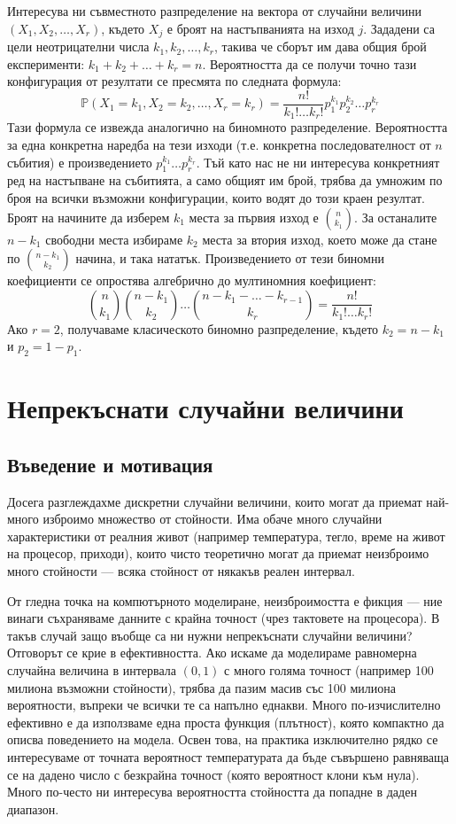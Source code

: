 Интересува ни съвместното разпределение на вектора от случайни величини $(X_1, X_2, \dots, X_r)$, където $X_j$ е броят на настъпванията на изход $j$. Зададени са цели неотрицателни числа $k_1, k_2, \dots, k_r$, такива че сборът им дава общия брой експерименти: $k_1 + k_2 + \dots + k_r = n$.
Вероятността да се получи точно тази конфигурация от резултати се пресмята по следната формула:
\[
\mathbb{P}(X_1=k_1, X_2=k_2, \dots, X_r=k_r) = \frac{n!}{k_1! \dots k_r!} p_1^{k_1} p_2^{k_2} \dots p_r^{k_r}
\]
Тази формула се извежда аналогично на биномното разпределение. Вероятността за една конкретна наредба на тези изходи (т.е. конкретна последователност от $n$ събития) е произведението $p_1^{k_1} \dots p_r^{k_r}$. Тъй като нас не ни интересува конкретният ред на настъпване на събитията, а само общият им брой, трябва да умножим по броя на всички възможни конфигурации, които водят до този краен резултат.
Броят на начините да изберем $k_1$ места за първия изход е $\binom{n}{k_1}$. За останалите $n-k_1$ свободни места избираме $k_2$ места за втория изход, което може да стане по $\binom{n-k_1}{k_2}$ начина, и така нататък. Произведението от тези биномни коефициенти се опростява алгебрично до мултиномния коефициент:
\[
\binom{n}{k_1} \binom{n-k_1}{k_2} \dots \binom{n-k_1-\dots-k_{r-1}}{k_r} = \frac{n!}{k_1! \dots k_r!}
\]
Ако $r=2$, получаваме класическото биномно разпределение, където $k_2 = n - k_1$ и $p_2 = 1 - p_1$.

\section{Непрекъснати случайни величини}

\subsection{Въведение и мотивация}
Досега разглеждахме дискретни случайни величини, които могат да приемат най-много изброимо множество от стойности. Има обаче много случайни характеристики от реалния живот (например температура, тегло, време на живот на процесор, приходи), които чисто теоретично могат да приемат неизброимо много стойности — всяка стойност от някакъв реален интервал.

От гледна точка на компютърното моделиране, неизброимостта е фикция — ние винаги съхраняваме данните с крайна точност (чрез тактовете на процесора). В такъв случай защо въобще са ни нужни непрекъснати случайни величини?
Отговорът се крие в ефективността. Ако искаме да моделираме равномерна случайна величина в интервала $(0,1)$ с много голяма точност (например 100 милиона възможни стойности), трябва да пазим масив със 100 милиона вероятности, въпреки че всички те са напълно еднакви. Много по-изчислително ефективно е да използваме една проста функция (плътност), която компактно да описва поведението на модела.
Освен това, на практика изключително рядко се интересуваме от точната вероятност температурата да бъде съвършено равняваща се на дадено число с безкрайна точност (която вероятност клони към нула). Много по-често ни интересува вероятността стойността да попадне в даден диапазон.

